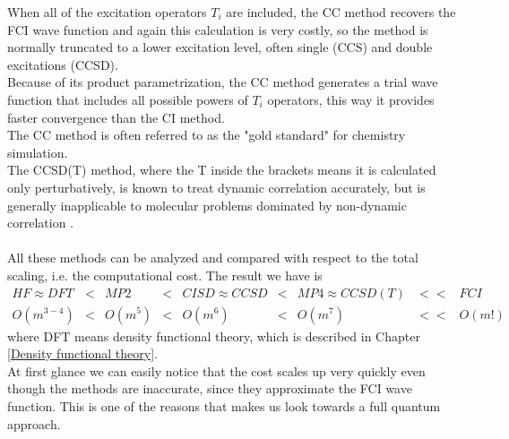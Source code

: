 When all of the excitation operators $T_i$ are included, the CC method recovers the FCI wave function and again this calculation is very costly, so the method is normally truncated to a lower excitation level, often single (CCS) and double excitations (CCSD). \\
Because of its product parametrization, the CC method generates a trial wave function that includes all possible powers of $T_i$ operators, this way it provides faster convergence than the CI method. \\
The CC method is often referred to as the "gold standard" for chemistry simulation. \\
The CCSD(T) method, where the T inside the brackets means it is calculated only perturbatively, is known to treat dynamic correlation accurately, but is generally inapplicable to molecular problems dominated by non-dynamic correlation \cite{Elfving2020Sep}. \\
\\
All these methods can be analyzed and compared with respect to the total scaling, i.e. the computational cost. The result we have is \cite{BibEntry2006Aug}
\begin{equation}
\begin{matrix}
    HF \approx DFT & < & MP2 & < & CISD \approx CCSD & < & MP4 \approx CCSD(T) & << & FCI \\
    O(m^{3-4}) & < & O(m^5) & < & O(m^6) & < & O(m^7) & << & O(m!) \label{classical scaling}
\end{matrix}
\end{equation}
where DFT means density functional theory, which is described in Chapter \ref{Density functional theory}. \\
At first glance we can easily notice that the cost scales up very quickly even though the methods are inaccurate, since they approximate the FCI wave function. This is one of the reasons that makes us look towards a full quantum approach.

